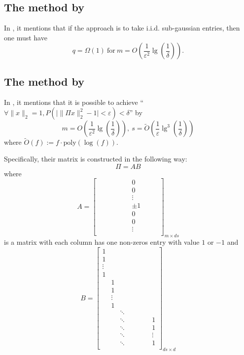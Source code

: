 \documentclass[11pt]{article}
\begin{document}
\subsection{The method by  \cite{matouvsek2008variants}}

In \cite{matouvsek2008variants}, it mentions that if the approach is to take i.i.d. sub-gaussian entries, then one must have  $$q=\Omega(1)~\text{for}~m=O(\frac{1}{\varepsilon^2}\lg(\frac{1}{\delta})).$$

\subsection{The method by  \cite{dasgupta2010sparse}}
In \cite{dasgupta2010sparse}, it mentions that it is possible to achieve ``$\forall \|x\|_2=1,P(\big|\|\Pi x\|^2_2-1\big|<\varepsilon)<\delta$'' by 
$$m=O(\frac{1}{\varepsilon^2}\lg(\frac{1}{\delta})),~s=\tilde{O}(\frac{1}{\varepsilon}\lg^3(\frac{1}{\delta}))$$
where $\tilde{O}(f):=f\cdot \text{poly}(\log(f))$. 

Specifically, their matrix is constructed in the following way:
$$\Pi=AB$$
where 
$$A=\begin{bmatrix}
&&&& &  &  0&  &  & \\ 
&&&& &  &  0&  &  & \\ 
 &&&&&  &  \vdots&  &  &\\
 &&&&&  &  \pm 1  &  &\\
&&&& &  &  0&  &  & \\ 
  &&&& &  &  0&  &  & \\ 
   &&&&&  &  \vdots&  &  &\\
\end{bmatrix}_{m\times ds}
$$
is a matrix with each column has one non-zeros entry with value $1$ or $-1$
and 
$$
B=\begin{bmatrix}
1& &&&&&&\\
1&&&&&&&\\
\vdots &&&&&&&\\
1 &&&&&&&\\
&1&&&&&&\\
&1&&&&&&\\
&\vdots &&&&&&\\
&1&&&&&&\\
&&\ddots &&&&&\\
&&\ddots &&&&&1\\
&&\ddots &&&&&1\\
&&\ddots &&&&&\vdots\\
&&\ddots &&&&&1\\
\end{bmatrix}_{ds\times d}
$$
\end{document}
